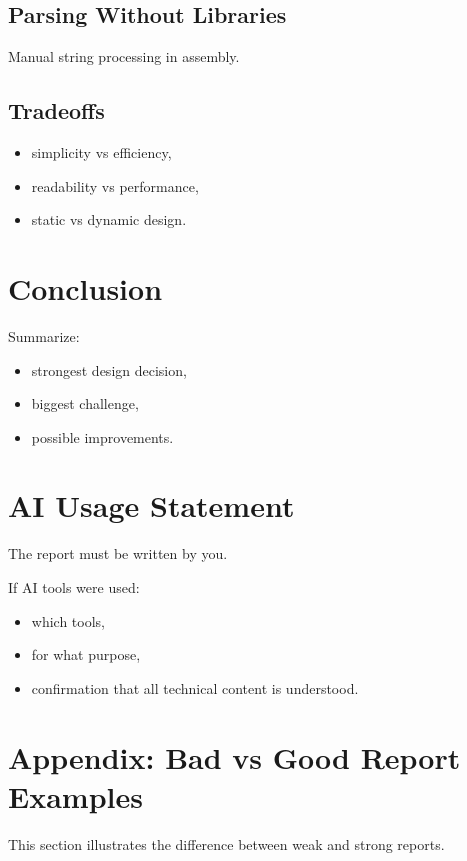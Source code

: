 \documentclass[a4paper,12pt]{article}
\begin{document}
\subsection{Parsing Without Libraries}

Manual string processing in assembly.

\subsection{Tradeoffs}

\begin{itemize}
\item simplicity vs efficiency,
\item readability vs performance,
\item static vs dynamic design.
\end{itemize}

\section{Conclusion}

Summarize:

\begin{itemize}
\item strongest design decision,
\item biggest challenge,
\item possible improvements.
\end{itemize}

\section*{AI Usage Statement}

The report must be written by you.

If AI tools were used:
\begin{itemize}
\item which tools,
\item for what purpose,
\item confirmation that all technical content is understood.
\end{itemize}

\newpage

\section*{Appendix: Bad vs Good Report Examples}

This section illustrates the difference between weak and strong reports.
\end{document}
